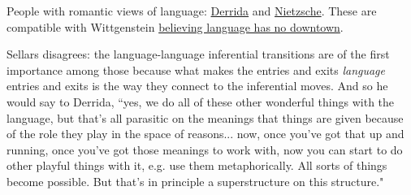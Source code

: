 People with romantic views of language: \href{doc/phil/People/Derrida}{Derrida} and \href{doc/phil/People/Nietzsche}{Nietzsche}. These are compatible with Wittgenstein \href{doc/phil/People/Wittgenstein/Quotes/Downtown}{believing language has no downtown}.

Sellars disagrees: the language-language inferential transitions are of the first importance among those because what makes the entries and exits \emph{language} entries and exits is the way they connect to the inferential moves. And so he would say to Derrida, ``yes, we do all of these other wonderful things with the language, but that's all parasitic on the meanings that things are given because of the role they play in the space of reasons... now, once you've got that up and running, once you've got those meanings to work with, now you can start to do other playful things with it, e.g. use them metaphorically. All sorts of things become possible. But that's in principle a superstructure on this structure."
